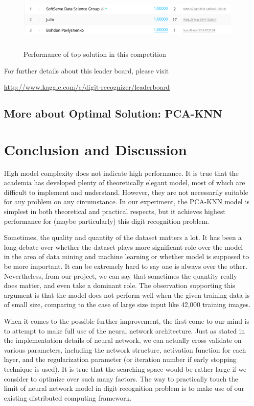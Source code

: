 \documentclass{article} %
\begin{document}
\begin{figure}[h]
    \centering
    \includegraphics[width=5.5in,height=0.9in]{./images/topRank.png} \\
    \caption{Performance of top solution in this competition}
\end{figure}
For further details about this leader board, please visit
\begin{center}
\url{http://www.kaggle.com/c/digit-recognizer/leaderboard} 
\end{center}

\subsection{More about Optimal Solution: PCA-KNN}
\section{Conclusion and Discussion} \label{Conclu}

High model complexity does not indicate high performance. It is true that the academia
has developed plenty of theoretically elegant model, most of which are
difficult to implement and understand. However, they are not necessarily suitable
for any problem on any circumstance. In our experiment, the PCA-KNN model is
simplest in both theoretical and practical respects, but it achieves highest
performance for (maybe particularly) this digit recognition problem.

Sometimes, the quality and quantity of the dataset matters a lot. It has been
a long debate over whether the dataset plays more significant role over the
model in the area of data mining and machine learning or whether model is
supposed to be more important. It can be extremely hard to say one is always
over the other. Nevertheless, from our project, we can say that sometimes the
quantity really does matter, and even take a dominant role. The observation
supporting this argument is that the \knn model does not perform well when the
given training data is of small size, comparing to the case of large size
input like 42,000 training images.  


When it comes to the possible further improvement, the first come to our mind
is to attempt to make full use of the neural network architecture. Just as
stated in the implementation details of neural network, we can actually cross
validate on various parameters, including the network structure, activation
function for each layer, and the regularization parameter (or iteration number
if early stopping technique is used). It is true that the searching space
would be rather large if we consider to optimize over such many factors. The
way to practically touch the limit of neural network model in digit
recognition problem is to make use of our existing distributed computing
framework.
\end{document}
